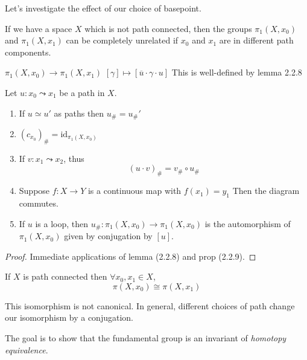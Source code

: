 \documentclass{article}
\newcommand{\id}{\mathrm{id}}
\numberwithin{nthm}{subsection}
\begin{document}
Let's investigate the effect of our choice of basepoint.

If we have a space $X$ which is not path connected, then the groups $\pi_1(X, x_0)$ and $\pi_1(X, x_1)$ can be completely unrelated if $x_0$ and $x_1$ are in different path components.

$\pi_1(X, x_0) \to \pi_1(X, x_1)$
$[\gamma] \mapsto [\overline{u} \cdot \gamma \cdot u]$
This is well-defined by lemma 2.2.8

\begin{prop}
    Let $u: x_0 \leadsto x_1$ be a path in $X$.
    \begin{enumerate}[label=(\roman*)]
        \setcounter{enumi}{0}
        \item If $u \simeq u'$ as paths then $u_{\#} = u_{\#}'$
        \item $(c_{x_0})_{\#} = \id_{\pi_1(X, x_0)}$
        \item If $v: x_1 \leadsto x_2$, thus
            \begin{equation*}
                (u \cdot v)_{\#} = v_{\#} \circ u_{\#}
            \end{equation*}

        \item Suppose $f:X \to Y$ is a continuous map with $f(x_1) = y_1$
                Then the diagram commutes.
        \item If $u$ is a loop, then $u_{\#}: \pi_1(X, x_0) \to \pi_1(X, x_0)$ is the automorphism of $\pi_1(X, x_0)$ given by conjugation by $[u]$.
    \end{enumerate}
\end{prop}

\begin{proof}
    Immediate applications of lemma (2.2.8) and prop (2.2.9).
\end{proof}

\begin{cor}
    If $X$ is path connected then $\forall x_0, x_1 \in X$,
    \begin{equation*}
        \pi(X, x_0) \cong \pi(X, x_1)
    \end{equation*}
\end{cor}

\begin{warning}
    This isomorphism is not canonical. In general, different choices of path change our isomorphism by a conjugation.
\end{warning}

The goal is to show that the fundamental group is an invariant of \emph{homotopy equivalence}.
\end{document}
